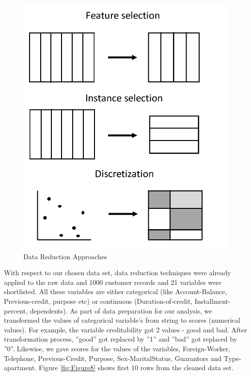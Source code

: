 \documentclass[sigconf]{acmart}
\begin{document}
\begin{figure}[htb]
  \centering
  \includegraphics[width=1.0\columnwidth]{images/Figure7.png}
  \caption{Data Reduction Approaches
  \cite{preprocessing}}
  \label{fig:Figure7} 
\end{figure}

With respect to our chosen data set, data reduction techniques were already applied to the raw data and 1000 customer records and 21 variables were shortlisted. All these variables are either categorical (like Account-Balance, Previous-credit, purpose etc) or continuous (Duration-of-credit, Installment-percent, dependents). As part of data preparation for our analysis, we transformed the values of categorical variable's from string to scores (numerical values). For example, the variable creditability got 2 values - good and bad. After transformation process, ''good'' got replaced by ''1'' and ''bad'' got replaced by ''0''. Likewise, we gave scores for the values of the variables, Foreign-Worker, Telephone, Previous-Credit, Purpose, Sex-MaritalStatus, Guarantors and Type-apartment. Figure \ref{fig:Figure8} shows first 10 rows from the cleaned data set. 
\end{document}
